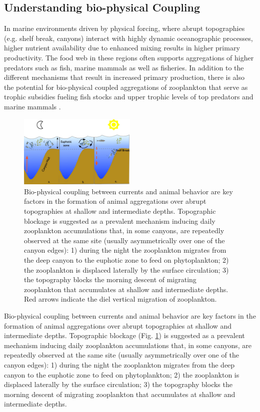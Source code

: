 \subsection{Understanding bio-physical Coupling}

In marine environments driven by physical forcing, where abrupt
topographies (e.g. shelf break, canyons) interact with highly dynamic
oceanographic processes, higher nutrient availability due to enhanced
mixing results in higher primary productivity.  The food web in these
regions often supports aggregations of higher predators such as fish,
marine mammals as well as fisheries. In addition to the different
mechanisms that result in increased primary production, there is also
the potential for bio-physical coupled aggregations of zooplankton
that serve as trophic subsidies fueling fish stocks and upper trophic
levels of top predators and marine mammals \cite{genin04}.

\begin{figure}
  \centering
  \includegraphics[width=0.5\textwidth]{fig/plankton-canyon.jpg}
  \caption{Bio-physical coupling between currents and animal behavior
    are key factors in the formation of animal aggregations over
    abrupt topographies at shallow and intermediate
    depths. Topographic blockage is suggested as a prevalent mechanism
    inducing daily zooplankton accumulations that, in some canyons,
    are repeatedly observed at the same site (usually asymmetrically
    over one of the canyon edges): 1) during the night the zooplankton
    migrates from the deep canyon to the euphotic zone to feed on
    phytoplankton; 2) the zooplankton is displaced laterally by the
    surface circulation; 3) the topography blocks the morning descent
    of migrating zooplankton that accumulates at shallow and
    intermediate depths.  Red arrows indicate the diel vertical
    migration of zooplankton.}
  \label{fig:plankton}
  \vspace{-0.5cm}
\end{figure}

Bio-physical coupling between currents and animal behavior are key
factors in the formation of animal aggregations over abrupt
topographies at shallow and intermediate depths. Topographic blockage
(Fig. \ref{fig:plankton}) is suggested as a prevalent mechanism
inducing daily zooplankton accumulations that, in some canyons, are
repeatedly observed at the same site (usually asymmetrically over one
of the canyon edges): 1) during the night the zooplankton migrates
from the deep canyon to the euphotic zone to feed on phytoplankton; 2)
the zooplankton is displaced laterally by the surface circulation; 3)
the topography blocks the morning descent of migrating zooplankton
that accumulates at shallow and intermediate depths.

